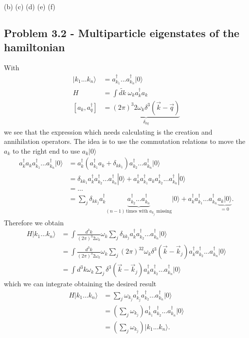 \documentclass[10pt,a4paper]{book}
\theoremstyle{definition}
\begin{document}
(b)
(c)
(d)
(e)
(f)

\subsection{Problem 3.2 - Multiparticle eigenstates of the hamiltonian}
With
\begin{align}
|k_1...k_n\rangle&=a^\dagger_{k_1}...a^\dagger_{k_n}|0\rangle\\
H&=\int\widetilde{dk}\;\omega_k a^\dagger_ka_k\\
[a_k,a_q^\dagger]&=\underbrace{(2\pi)^3 2\omega_k\delta^3(\vec{k}-\vec{q})}_{\delta_{kq}}
\end{align}
we see that the expression which needs calculating is the creation and annihilation operators. The idea is to use the commutation relations to move the $a_k$ to the right end to use $a_k|0\rangle$
\begin{align}
a^\dagger_ka_ka^\dagger_{k_1}...a^\dagger_{k_n}|0\rangle
&=a^\dagger_k(a^\dagger_{k_1}a_k+\delta_{kk_1})a^\dagger_{k_2}...a^\dagger_{k_n}|0\rangle\\
&=\delta_{kk_1}a^\dagger_ka^\dagger_{k_2}...a^\dagger_{k_n}|0\rangle
+a^\dagger_ka^\dagger_{k_1}a_ka^\dagger_{k_2}...a^\dagger_{k_n}|0\rangle\\
&=...\\
&=\sum_j\delta_{kk_j}a^\dagger_k\underbrace{a^\dagger_{k_2}...a^\dagger_{k_n}}_{(n-1)\, \text{times with}\;a_{k_j}\;\text{missing}}|0\rangle+a^\dagger_ka^\dagger_{k_1}...a^\dagger_{k_n}\underbrace{a_k|0\rangle}_{=0}.
\end{align}
Therefore we obtain
\begin{align}
H|k_1...k_n\rangle
&=\int\frac{d^3k}{(2\pi)^3 2\omega_k}\omega_k\sum_j\delta_{kk_j}a^\dagger_ka^\dagger_{k_2}...a^\dagger_{k_n}|0\rangle\\
&=\int\frac{d^3k}{(2\pi)^3 2\omega_k}\omega_k\sum_j(2\pi)^32\omega_k\delta^3(\vec{k}-\vec{k}_j)a^\dagger_ka^\dagger_{k_2}...a^\dagger_{k_n}|0\rangle\\
&=\int d^3k\omega_k\sum_j\delta^3(\vec{k}-\vec{k}_j)a^\dagger_ka^\dagger_{k_2}...a^\dagger_{k_n}|0\rangle
\end{align}
which we can integrate obtaining the desired result
\begin{align}
H|k_1...k_n\rangle
&=\sum_j\omega_{k_j}a^\dagger_{k_j}a^\dagger_{k_2}...a^\dagger_{k_n}|0\rangle\\
&=\left(\sum_j\omega_{k_j}\right)a^\dagger_{k_1}a^\dagger_{k_2}...a^\dagger_{k_n}|0\rangle\\
&=\left(\sum_j\omega_{k_j}\right)|k_1...k_n\rangle.
\end{align}
\end{document}
